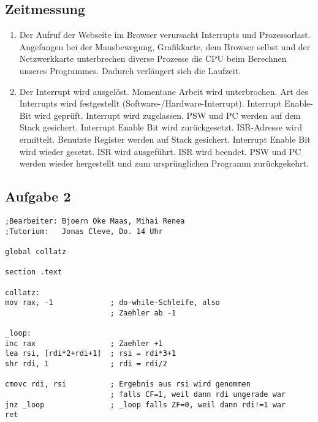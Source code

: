 \documentclass[paper=a4, english, ngerman]{scrartcl}
\begin{document}
	\subsection*{Zeitmessung}
	\begin{enumerate}
	\item Der Aufruf der Webseite im Browser verursacht Interrupts und Prozessorlast. Angefangen bei der Mausbewegung, Grafikkarte, dem Browser selbst und der Netzwerkkarte unterbrechen diverse Prozesse die CPU beim Berechnen unseres Programmes. Dadurch verlängert sich die Laufzeit.
	
	\item Der Interrupt wird ausgelöst. Momentane Arbeit wird unterbrochen. Art des Interrupts wird festgestellt (Software-/Hardware-Interrupt). Interrupt Enable-Bit wird geprüft. Interrupt wird zugelassen. PSW und PC werden auf dem Stack gesichert. Interrupt Enable Bit wird zurückgesetzt. ISR-Adresse wird ermittelt. Benutzte Register werden auf Stack gesichert. Interrupt Enable Bit wird wieder gesetzt. ISR wird ausgeführt. ISR wird beendet. PSW und PC werden wieder hergestellt und zum ursprünglichen Programm zurückgekehrt.
	\end{enumerate}

\pagebreak

	\subsection*{Aufgabe 2}
\begin{lstlisting}
;Bearbeiter: Bjoern Oke Maas, Mihai Renea
;Tutorium:   Jonas Cleve, Do. 14 Uhr

global collatz

section .text

collatz:
mov rax, -1				; do-while-Schleife, also
						; Zaehler ab -1

_loop:
inc rax					; Zaehler +1
lea rsi, [rdi*2+rdi+1]	; rsi = rdi*3+1
shr rdi, 1				; rdi = rdi/2

cmovc rdi, rsi			; Ergebnis aus rsi wird genommen
						; falls CF=1, weil dann rdi ungerade war
jnz _loop				; _loop falls ZF=0, weil dann rdi!=1 war
ret




\end{lstlisting}
\end{document}

